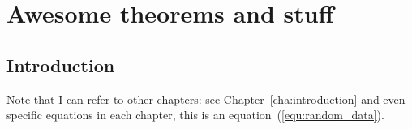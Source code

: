 
\chapter{Awesome theorems and stuff}\label{cha:awesome_theorems_and_stuff}

\section{Introduction}

Note that I can refer to other chapters: see Chapter~\ref{cha:introduction} and
even specific equations in each chapter, this is an
equation~(\ref{equ:random_data}).

\lipsum
